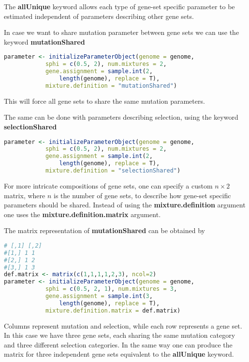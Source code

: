 The \textbf{allUnique} keyword allows each type of gene-set specific parameter to be estimated independent of parameters describing other gene sets.

In case we want to share mutation parameter between gene sets we can use the keyword \textbf{mutationShared}

\begin{lstlisting}[language=R]
parameter <- initializeParameterObject(genome = genome, 
			sphi = c(0.5, 2), num.mixtures = 2,
			gene.assignment = sample.int(2, 
				length(genome), replace = T),
			mixture.definition = "mutationShared")
\end{lstlisting}

This will force all gene sets to share the same mutation parameters.

The same can be done with parameters describing selection, using the keyword \textbf{selectionShared}

\begin{lstlisting}[language=R]
parameter <- initializeParameterObject(genome = genome, 
			sphi = c(0.5, 2), num.mixtures = 2,
			gene.assignment = sample.int(2, 
				length(genome), replace = T),
			mixture.definition = "selectionShared")
\end{lstlisting}

For more intricate compositions of gene sets, one can specify a custom $n \times 2$ matrix, where $n$ is the number of gene sets, to describe how gene-set specific parameters should be shared. 
Instead of using the \textbf{mixture.definition} argument one uses the \textbf{mixture.definition.matrix} argument.

The matrix representation of \textbf{mutationShared} can be obtained by

\begin{lstlisting}[language=R]
# [,1] [,2]
#[1,] 1 1
#[2,] 1 2
#[3,] 1 3
def.matrix <- matrix(c(1,1,1,1,2,3), ncol=2)
parameter <- initializeParameterObject(genome = genome, 
			sphi = c(0.5, 2, 1), num.mixtures = 3,
			gene.assignment = sample.int(3, 
				length(genome), replace = T),
			mixture.definition.matrix = def.matrix)
\end{lstlisting}

Columns represent mutation and selection, while each row represents a gene set. 
In this case we have three gene sets, each sharing the same mutation category and three different selection categories.
In the same way one can produce the matrix for three independent gene sets equivalent to the \textbf{allUnique} keyword.

